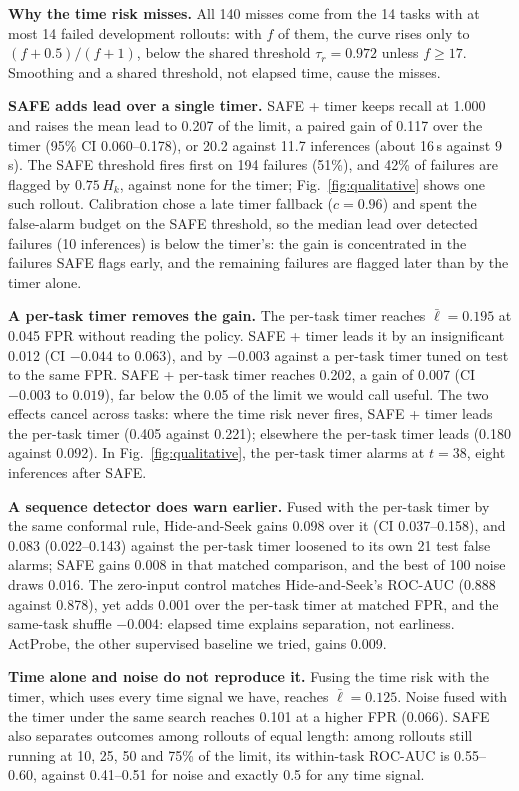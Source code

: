\documentclass[10pt,a4paper,twocolumn]{article}
\begin{document}
\textbf{Why the time risk misses.} All 140 misses come from the 14 tasks with at most 14
failed development rollouts: with $f$ of them, the curve rises only to $(f+0.5)/(f+1)$, below
the shared threshold $\tau_r = 0.972$ unless $f \ge 17$. Smoothing and a shared threshold, not
elapsed time, cause the misses.


\textbf{SAFE adds lead over a single timer.} SAFE + timer keeps recall at 1.000 and raises the
mean lead to 0.207 of the limit, a paired gain of 0.117 over the timer (95\% CI
0.060--0.178), or 20.2 against 11.7 inferences (about 16\,s against 9\,s). The SAFE
threshold fires first on 194 failures (51\%), and 42\% of failures are flagged by
$0.75\,H_k$, against none for the timer; Fig.~\ref{fig:qualitative} shows one such rollout. Calibration chose a late
timer fallback ($c = 0.96$) and spent the false-alarm budget on the SAFE threshold, so the
median lead over detected failures (10 inferences) is below the timer's: the gain is
concentrated in the failures SAFE flags early, and the remaining failures are flagged later
than by the timer alone.

\textbf{A per-task timer removes the gain.} The per-task timer reaches $\bar\ell = 0.195$ at
0.045 FPR without reading the policy. SAFE + timer leads it by an insignificant 0.012 (CI
$-0.044$ to $0.063$), and by $-0.003$ against a per-task timer tuned on test to the same FPR.
SAFE + per-task timer reaches 0.202, a gain of 0.007 (CI $-0.003$ to $0.019$), far below the
0.05 of the limit we would call useful. The two effects cancel across tasks: where the time
risk never fires, SAFE + timer leads the per-task timer (0.405 against 0.221); elsewhere the
per-task timer leads (0.180 against 0.092). In Fig.~\ref{fig:qualitative}, the per-task timer
alarms at $t = 38$, eight inferences after SAFE.

\textbf{A sequence detector does warn earlier.} Fused with the per-task timer by the same
conformal rule, Hide-and-Seek gains 0.098 over it (CI 0.037--0.158), and 0.083 (0.022--0.143)
against the per-task timer loosened to its own 21 test false alarms; SAFE gains 0.008 in that
matched comparison, and the best of 100 noise draws 0.016. The zero-input control matches
Hide-and-Seek's ROC-AUC (0.888 against 0.878), yet adds 0.001 over the per-task timer at
matched FPR, and the same-task shuffle $-0.004$: elapsed time explains separation, not
earliness. ActProbe, the other supervised baseline we tried, gains 0.009.

\textbf{Time alone and noise do not reproduce it.} Fusing the time risk with the timer, which
uses every time signal we have, reaches $\bar\ell = 0.125$. Noise fused with the timer under
the same search reaches 0.101 at a higher FPR (0.066). SAFE also separates outcomes among
rollouts of equal length: among rollouts still running at 10, 25, 50 and 75\% of the limit,
its within-task ROC-AUC is 0.55--0.60, against 0.41--0.51 for noise and exactly 0.5 for any
time signal.
\end{document}
